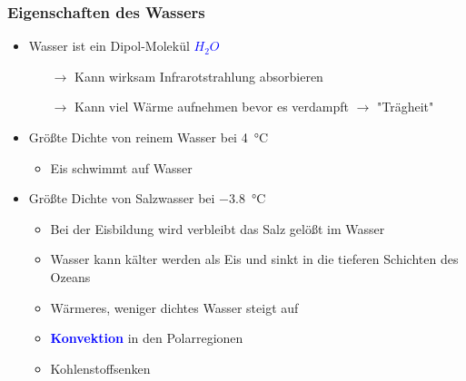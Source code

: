 \begin{frame}
	\frametitle{Eigenschaften des Wassers} %
	\begin{itemize}
		\item Wasser ist ein Dipol-Molekül \textcolor{blue}{$H_2O$}
		\begin{itemize}
			\item[$\rightarrow$] Kann wirksam Infrarotstrahlung absorbieren
			\item[$\rightarrow$] Kann viel Wärme aufnehmen bevor es verdampft $\rightarrow$ "Trägheit"
		\end{itemize}

		\item<2-> Größte Dichte von reinem Wasser bei \SI{4}{\degreeCelsius}
		\begin{itemize}
			\item<2->[$\rightarrow$] Eis schwimmt auf Wasser
		\end{itemize}
		\item<3->Größte Dichte von Salzwasser bei \SI{-3,8}{\degreeCelsius}
		\begin{itemize}
			\item<3-> [] Bei der Eisbildung wird verbleibt das Salz gelößt im Wasser
			\item<3-> [$\rightarrow$] Wasser kann kälter werden als Eis und sinkt in die tieferen Schichten des Ozeans
			\item<3-> [$\rightarrow$] Wärmeres, weniger dichtes Wasser steigt auf
			\item<3-> [] \textbf{\textcolor{blue}{Konvektion}} in den Polarregionen
			\item<3-> [$\rightarrow$] Kohlenstoffsenken
		\end{itemize}
	\end{itemize}



\end{frame}

